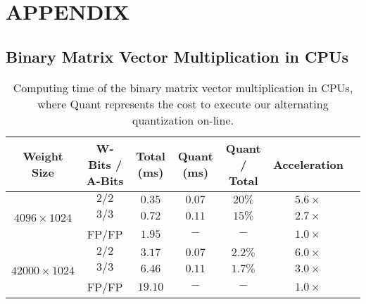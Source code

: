 \documentclass{article} %
\newcommand{\<}{\left\langle}
\renewcommand{\>}{\right\rangle}
\begin{document}
\chapter{\LARGE APPENDIX}
%
\section{Binary Matrix Vector Multiplication in CPUs}
\label{multiplicationinCPU}
\begin{table}[h!]
	\caption{Computing time of the binary matrix vector multiplication in CPUs, where Quant represents the cost to execute our alternating quantization on-line.}
	\renewcommand{\arraystretch}{1.3}
	\label{acceleration}
	\begin{center}
		\begin{tabular}{|c|c|c|c|c|c|c|}
			\hline
			\small{Weight Size} & \small{W-Bits / A-Bits} & \small{Total (ms)} & \small{Quant (ms)} & \small{Quant / Total} & \small{Acceleration} \\
			\hline
			\multirow{3}{*}{\centering $4096 \times 1024$}
			& $2/2$ & $0.35$ & $0.07$ & $20\%$ & $5.6 \times$ \\
			\cline{2-6}
			& $3/3$ & $0.72$  & $0.11$ & $15\%$ & $2.7 \times$ \\
			\cline{2-6}
			& FP/FP & $1.95$  & $-$ & $-$ & $1.0 \times$ \\
			\hline
			\hline
			\multirow{3}{*}{\centering $42000 \times 1024$}
			& $2/2$ & $3.17$  & $0.07$ & $2.2\%$ & $6.0 \times$ \\
			\cline{2-6}
			& $3/3$ & $6.46$  & $0.11$ & $1.7\%$ & $3.0 \times$ \\
			\cline{2-6}
			& FP/FP & $19.10$ & $-$ & $-$ & $1.0 \times$ \\
			\hline
		\end{tabular}
	\end{center}
\end{table}
\end{document}
